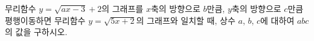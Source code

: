 무리함수 $y=\sqrt{ax-3}+2$의 그래프를 $x$축의 방향으로 $b$만큼, $y$축의 방향으로 $c$만큼 평행이동하면 무리함수 $y=\sqrt{5x+2}$의 그래프와 일치할 때, 상수 $a$, $b$, $c$에 대하여 $abc$의 값을 구하시오.
